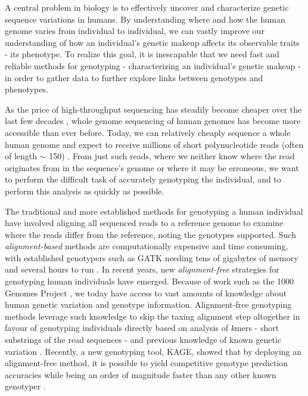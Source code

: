 A central problem in biology is to effectively uncover and characterize genetic sequence variations in humans.
By understanding where and how the human genome varies from individual to individual, we can vastly improve our understanding of how an individual's genetic makeup affects its observable traits - its phenotype.
To realize this goal, it is inescapable that we need fast and reliable methods for genotyping - characterizing an individual's genetic makeup - in order to gather data to further explore links between genotypes and phenotypes.

As the price of high-throughput sequencing has steadily become cheaper over the last few decades \cite{nhgri_sequencing_cost}, whole genome sequencing of human genomes has become more accessible than ever before.
Today, we can relatively cheaply sequence a whole human genome and expect to receive millions of short polynucleotide reads (often of length $\sim$ 150) \cite{illumina_read_length}.
From just such reads, where we neither know where the read originates from in the sequence's genome or where it may be erroneous, we want to perform the difficult task of accurately genotyping the individual, and to perform this analysis as quickly as possible.

The traditional and more established methods for genotyping a human individual have involved aligning all sequenced reads to a reference genome to examine where the reads differ from the reference, noting the genotypes supported.
Such \textit{alignment-based} methods are computationally expensive and time consuming, with established genotypers such as GATK \cite{gatk} needing tens of gigabytes of memory and several hours to run \cite{kage}.
In recent years, new \textit{alignment-free} strategies for genotyping human individuals have emerged.
Because of work such as the 1000 Genomes Project \cite{1000_genomes_project}, we today have access to vast amounts of knowledge about human genetic variation and genotype information.
Alignment-free genotyping methods leverage such knowledge to skip the taxing alignment step altogether in favour of genotyping individuals directly based on analysis of \textit{k}mers - short substrings of the read sequences - and previous knowledge of known genetic variation \cite{kage,malva}.
Recently, a new genotyping tool, KAGE, showed that by deploying an alignment-free method, it is possible to yield competitive genotype prediction accuracies while being an order of magnitude faster than any other known genotyper \cite{kage}.

